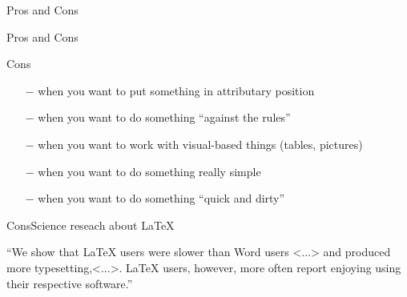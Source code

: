 
\begin{frame}{Pros and Cons}

\Huge\centering Pros and Cons
     
\end{frame}

\begin{frame}[fragile]{Cons}\relax
     \begin{itemize}
        \item[$-$] when you want to put something in {\csk attributary position} %
        \item[$-$] when you want to do something {\csk ``against the rules''} %
        \item[$-$] when you want to work with {\csk visual-based} things (tables, pictures) %
        \item[$-$] when you want to do something really {\csk simple} %
        \item[$-$] when you want to do something {\csk ``quick and dirty''} %
    \end{itemize}
    
    \cprotect{}
\end{frame}

\begin{frame}{Cons}{Science reseach about \LaTeX}\relax
     \begin{center}
     ``We show that LaTeX users were {\color{red}slower} than Word users <...> and produced {\color{red}more typesetting},<...>. LaTeX users, however, more often report {\color{green}enjoying using} their respective software.''  
     \end{center}

\end{frame}

